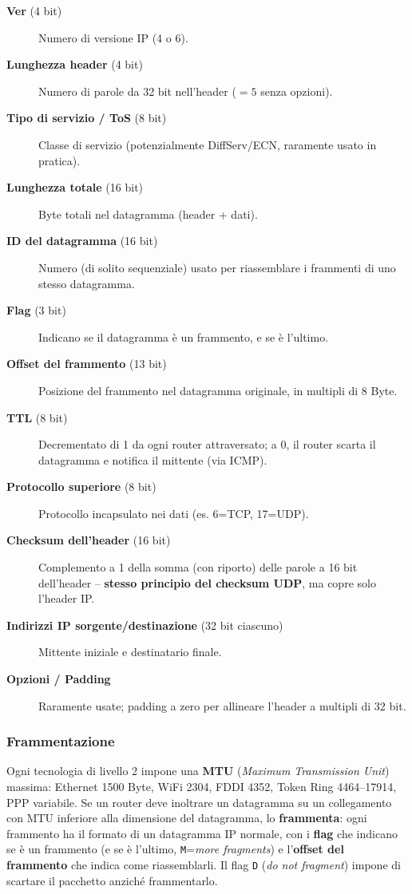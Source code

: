 \documentclass[12pt, a4paper]{article}
\begin{document}
\begin{description}
    \item[\textbf{Ver} (4 bit)] Numero di versione IP (4 o 6).
    \item[\textbf{Lunghezza header} (4 bit)] Numero di parole da 32 bit nell'header ($=5$ senza opzioni).
    \item[\textbf{Tipo di servizio / ToS} (8 bit)] Classe di servizio (potenzialmente DiffServ/ECN, raramente usato in pratica).
    \item[\textbf{Lunghezza totale} (16 bit)] Byte totali nel datagramma (header + dati).
    \item[\textbf{ID del datagramma} (16 bit)] Numero (di solito sequenziale) usato per riassemblare i frammenti di uno stesso datagramma.
    \item[\textbf{Flag} (3 bit)] Indicano se il datagramma è un frammento, e se è l'ultimo.
    \item[\textbf{Offset del frammento} (13 bit)] Posizione del frammento nel datagramma originale, in multipli di 8 Byte.
    \item[\textbf{TTL} (8 bit)] Decrementato di 1 da ogni router attraversato; a 0, il router scarta il datagramma e notifica il mittente (via ICMP).
    \item[\textbf{Protocollo superiore} (8 bit)] Protocollo incapsulato nei dati (es. 6=TCP, 17=UDP).
    \item[\textbf{Checksum dell'header} (16 bit)] Complemento a 1 della somma (con riporto) delle parole a 16 bit dell'header -- \textbf{stesso principio del checksum UDP}, ma copre solo l'header IP.
    \item[\textbf{Indirizzi IP sorgente/destinazione} (32 bit ciascuno)] Mittente iniziale e destinatario finale.
    \item[\textbf{Opzioni / Padding}] Raramente usate; padding a zero per allineare l'header a multipli di 32 bit.
\end{description}

\subsubsection{Frammentazione}

Ogni tecnologia di livello 2 impone una \textbf{MTU} (\textit{Maximum Transmission Unit}) massima: Ethernet 1500 Byte, WiFi 2304, FDDI 4352, Token Ring 4464--17914, PPP variabile. Se un router deve inoltrare un datagramma su un collegamento con MTU inferiore alla dimensione del datagramma, lo \textbf{frammenta}: ogni frammento ha il formato di un datagramma IP normale, con i \textbf{flag} che indicano se è un frammento (e se è l'ultimo, \texttt{M}=\textit{more fragments}) e l'\textbf{offset del frammento} che indica come riassemblarli. Il flag \texttt{D} (\textit{do not fragment}) impone di scartare il pacchetto anziché frammentarlo.
\end{document}
